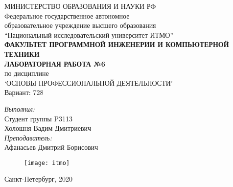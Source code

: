 \begin{center}
МИНИСТЕРСТВО ОБРАЗОВАНИЯ И НАУКИ РФ\\
\hfill \break
Федеральное государственное автономное\\ 
образовательное учреждение высшего образования\\
``Национальный исследовательский университет ИТМО''\\
\hfill \break
\textbf{ФАКУЛЬТЕТ ПРОГРАММНОЙ ИНЖЕНЕРИИ И КОМПЬЮТЕРНОЙ ТЕХНИКИ}\\
\vspace{2.5cm}
\large{\textbf{ЛАБОРАТОРНАЯ РАБОТА №6}}\\
по дисциплине\\
\large{`ОСНОВЫ ПРОФЕССИОНАЛЬНОЙ ДЕЯТЕЛЬНОСТИ'}\\
\hfill \break
Вариант: 728\\
\end{center}

\vspace{8cm}
 
\begin{flushright}
\textit{Выполнил:}\\
Студент группы P3113\\
Холошня Вадим Дмитриевич\\
\textit{Преподаватель:}\\
Афанасьев Дмитрий Борисович\\
\end{flushright}
 
\vfill

\begin{figure}[H]
\centering
\texttt{[image: itmo]}
\end{figure}
\begin{center} Санкт-Петербург, 2020 \end{center}

\thispagestyle{empty}
\newpage
